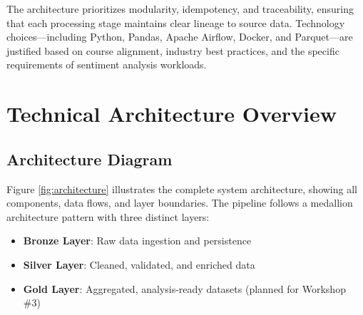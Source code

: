 \documentclass[11pt,a4paper]{article}
\begin{document}
The architecture prioritizes modularity, idempotency, and traceability, ensuring that each processing stage maintains clear lineage to source data. Technology choices—including Python, Pandas, Apache Airflow, Docker, and Parquet—are justified based on course alignment, industry best practices, and the specific requirements of sentiment analysis workloads.

\section{Technical Architecture Overview}

\subsection{Architecture Diagram}

Figure \ref{fig:architecture} illustrates the complete system architecture, showing all components, data flows, and layer boundaries. The pipeline follows a medallion architecture pattern with three distinct layers:

\begin{itemize}
    \item \textbf{Bronze Layer}: Raw data ingestion and persistence
    \item \textbf{Silver Layer}: Cleaned, validated, and enriched data
    \item \textbf{Gold Layer}: Aggregated, analysis-ready datasets (planned for Workshop \#3)
\end{itemize}
\end{document}
